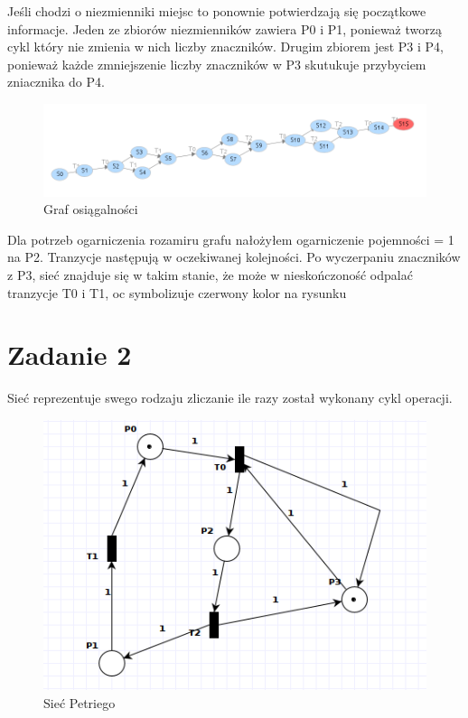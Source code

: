 \documentclass[12pt,a4paper,table]{article}
\begin{document}
    Jeśli chodzi o niezmienniki miejsc to ponownie potwierdzają się początkowe informacje.
    Jeden ze zbiorów niezmienników zawiera P0 i P1, ponieważ tworzą cykl który nie 
    zmienia w nich liczby znaczników.
    Drugim zbiorem jest P3 i P4, ponieważ każde zmniejszenie liczby znaczników w P3 skutukuje
    przybyciem zniacznika do P4.


    \begin{figure}[H]
        \centering
        \includegraphics[width=1\linewidth]{img/zad1-3.png}
        \caption{Graf osiągalności}
        \label{fig:zad1-3}
    \end{figure}

    Dla potrzeb ogarniczenia rozamiru grafu nałożyłem ogarniczenie pojemności = 1 na P2.
    Tranzycje następują w oczekiwanej kolejności. Po wyczerpaniu znaczników z P3, sieć
    znajduje się w takim stanie, że może w nieskończoność odpalać tranzycje T0 i T1, oc symbolizuje czerwony kolor na rysunku


    \section{Zadanie 2}

    Sieć reprezentuje swego rodzaju zliczanie ile razy został wykonany cykl operacji.

    \begin{figure}[H]
        \centering
        \includegraphics[width=0.6\linewidth]{img/zad2-1.png}
        \caption{Sieć Petriego}
        \label{fig:zad2-1}
    \end{figure}
\end{document}

